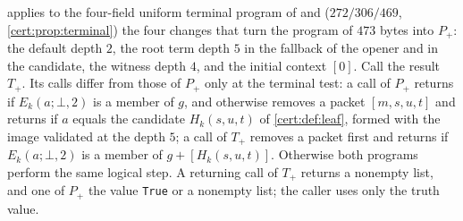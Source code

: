  applies to the four-field uniform terminal program of
 and  ($272/306/469$,
\cref{cert:prop:terminal}) the four changes that turn the program of $473$ bytes
into $P_{+}$: the default depth $2$, the root term depth $5$ in the fallback of
the opener and in the candidate, the witness depth $4$, and the initial context
$[0]$. Call the result $T_{+}$. Its calls differ from those of $P_{+}$ only at
the terminal test: a call of $P_{+}$ returns if $E_k(a;\bot,2)$ is a member of
$g$, and otherwise removes a packet $[m,s,u,t]$ and returns if $a$ equals the
candidate $H_k(s,u,t)$ of \cref{cert:def:leaf}, formed with the image validated
at the depth $5$; a call of $T_{+}$ removes a packet first and returns if
$E_k(a;\bot,2)$ is a member of $g+[H_k(s,u,t)]$. Otherwise both programs perform
the same logical step. A returning call of $T_{+}$ returns a nonempty list, and
one of $P_{+}$ the value \texttt{True} or a nonempty list; the caller uses only
the truth value.

